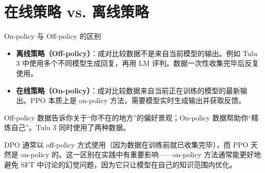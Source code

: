 \section{在线策略 vs. 离线策略}

\begin{knowledgebox}{On-policy 与 Off-policy 的区别}
\begin{itemize}
    \item \textbf{离线策略（Off-policy）}：成对比较数据不是来自当前模型的输出。例如 Tulu 3 中使用多个不同模型生成回复，再用 LM 评判。数据一次性收集完毕后反复使用。
    \item \textbf{在线策略（On-policy）}：成对比较数据来自当前正在训练的模型的最新输出。PPO 本质上是 on-policy 方法，需要模型实时生成输出并获取反馈。
\end{itemize}
Off-policy 数据告诉你关于``你不在的地方''的偏好景观；On-policy 数据帮助你``精炼自己''。Tulu 3 同时使用了两种数据。
\end{knowledgebox}

DPO 通常以 off-policy 方式使用（因为数据在训练前就已收集完毕），而 PPO 天然是 on-policy 的。这一区别在实践中有重要影响——on-policy 方法通常能更好地避免 SFT 中讨论的幻觉问题，因为它只让模型在自己的知识范围内优化。


